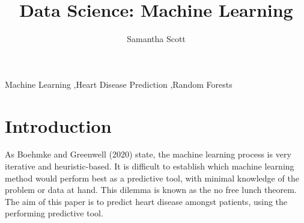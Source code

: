 \documentclass[11pt,preprint, authoryear]{elsarticle}
\numberwithin{equation}{section}
\numberwithin{figure}{section}
\numberwithin{table}{section}
\begin{document}
\begin{frontmatter}  %

\title{Data Science: Machine Learning}





\author[Add1]{Samantha Scott}





\address[Add1]{Stellenbosch University, Cape Town, South Africa}



\vspace{1cm}


\begin{keyword}
\footnotesize{
Machine Learning \sep Heart Disease Prediction \sep Random Forests \\
\vspace{0.3cm}
}
\end{keyword}



\vspace{0.5cm}

\end{frontmatter}


\newpage
\renewcommand{\contentsname}{Table of Contents}
{\tableofcontents}
\newpage

\pagestyle{fancy}
\chead{}
\lfoot{}
\lhead{}
\cfoot{}


\headsep 35pt %




\hypertarget{introduction}{%
\section{Introduction}\label{introduction}}

As Boehmke and Greenwell (2020) state, the machine learning process is
very iterative and heuristic-based. It is difficult to establish which
machine learning method would perform best as a predictive tool, with
minimal knowledge of the problem or data at hand. This dilemma is known
as the no free lunch theorem. The aim of this paper is to predict heart
disease amongst patients, using the performing predictive tool.
\end{document}
